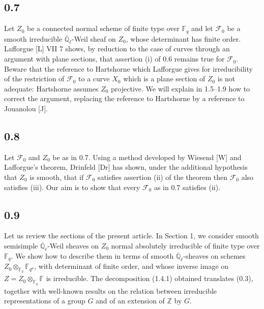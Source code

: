 \documentclass[11pt]{article}
\newcommand{\F}{\mathbb{F}}
\newcommand{\Z}{\mathbb{Z}}
\newcommand{\Ql}{\overline{\mathbb Q}_{\ell}}
\begin{document}
\subsection*{0.7}
Let $Z_0$ be a connected normal scheme of finite type over $\F_q$ and let $\mathcal F_0$ be a smooth irreducible $\Ql$-Weil sheaf on $Z_0$, whose determinant has finite order.
Lafforgue [L] VII 7 shows, by reduction to the case of curves through an argument with plane sections, that assertion (i) of 0.6 remains true for $\mathcal F_0$.
Beware that the reference to Hartshorne which Lafforgue gives for irreducibility of the restriction of $\mathcal F_0$ to a curve $X_0$ which is a plane section of $Z_0$ is not adequate: Hartshorne assumes $Z_0$ projective.
We will explain in 1.5--1.9 how to correct the argument, replacing the reference to Hartshorne by a reference to Jouanolou [J].

\subsection*{0.8}
Let $\mathcal F_0$ and $Z_0$ be as in 0.7.
Using a method developed by Wiesend [W] and Lafforgue's theorem, Drinfeld [Dr] has shown, under the additional hypothesis that $Z_0$ is smooth, that if $\mathcal F_0$ satisfies assertion (ii) of the theorem then $\mathcal F_0$ also satisfies (iii).
Our aim is to show that every $\mathcal F_0$ as in 0.7 satisfies (ii).

\subsection*{0.9}
Let us review the sections of the present article.
In Section 1, we consider smooth semisimple $\Ql$-Weil sheaves on $Z_0$ normal absolutely irreducible of finite type over $\F_q$.
We show how to describe them in terms of smooth $\Ql$-sheaves on schemes $Z_0\otimes_{\F_q}\F_{q^a}$, with determinant of finite order, and whose inverse image on $Z=Z_0\otimes_{\F_q}\F$ is irreducible.
The decomposition (1.4.1) obtained translates (0.3), together with well-known results on the relation between irreducible representations of a group $G$ and of an extension of $\Z$ by $G$.
\end{document}
